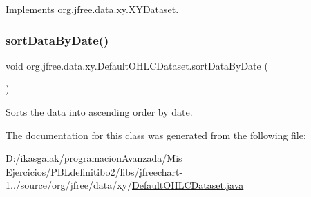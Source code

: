 Implements \mbox{\hyperlink{interfaceorg_1_1jfree_1_1data_1_1xy_1_1_x_y_dataset_aa915867221e0f94021bad3140db5254e}{org.\+jfree.\+data.\+xy.\+X\+Y\+Dataset}}.

\mbox{\label{classorg_1_1jfree_1_1data_1_1xy_1_1_default_o_h_l_c_dataset_aa3a2a174d89a61db93a432292d541f44}} 
\subsubsection{\texorpdfstring{sort\+Data\+By\+Date()}{sortDataByDate()}}
{\footnotesize\ttfamily void org.\+jfree.\+data.\+xy.\+Default\+O\+H\+L\+C\+Dataset.\+sort\+Data\+By\+Date (\begin{DoxyParamCaption}{ }\end{DoxyParamCaption})}

Sorts the data into ascending order by date. 

The documentation for this class was generated from the following file\+:\begin{DoxyCompactItemize}
\item 
D\+:/ikasgaiak/programacion\+Avanzada/\+Mis Ejercicios/\+P\+B\+Ldefinitibo2/libs/jfreechart-\/1../source/org/jfree/data/xy/\mbox{\hyperlink{_default_o_h_l_c_dataset_8java}{Default\+O\+H\+L\+C\+Dataset.\+java}}\end{DoxyCompactItemize}
